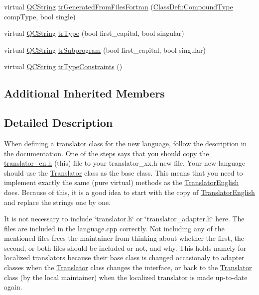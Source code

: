 \begin{DoxyCompactItemize}
\item 
virtual \mbox{\hyperlink{class_q_c_string}{Q\+C\+String}} \mbox{\hyperlink{class_translator_vietnamese_a6d35ff7785c1a994ab25f81bc09ba5fe}{tr\+Generated\+From\+Files\+Fortran}} (\mbox{\hyperlink{class_class_def_ae70cf86d35fe954a94c566fbcfc87939}{Class\+Def\+::\+Compound\+Type}} comp\+Type, bool single)
\item 
virtual \mbox{\hyperlink{class_q_c_string}{Q\+C\+String}} \mbox{\hyperlink{class_translator_vietnamese_a50c0eababc13e83e0ddf8caff673b40c}{tr\+Type}} (bool first\+\_\+capital, bool singular)
\item 
virtual \mbox{\hyperlink{class_q_c_string}{Q\+C\+String}} \mbox{\hyperlink{class_translator_vietnamese_a49e7db7f5dfd5402a3b89c78146df255}{tr\+Subprogram}} (bool first\+\_\+capital, bool singular)
\item 
virtual \mbox{\hyperlink{class_q_c_string}{Q\+C\+String}} \mbox{\hyperlink{class_translator_vietnamese_a666071701ac65aa7b81fabeedfbb1ea3}{tr\+Type\+Constraints}} ()
\end{DoxyCompactItemize}
\subsection*{Additional Inherited Members}


\subsection{Detailed Description}
When defining a translator class for the new language, follow the description in the documentation. One of the steps says that you should copy the \mbox{\hyperlink{translator__en_8h_source}{translator\+\_\+en.\+h}} (this) file to your translator\+\_\+xx.\+h new file. Your new language should use the \mbox{\hyperlink{class_translator}{Translator}} class as the base class. This means that you need to implement exactly the same (pure virtual) methods as the \mbox{\hyperlink{class_translator_english}{Translator\+English}} does. Because of this, it is a good idea to start with the copy of \mbox{\hyperlink{class_translator_english}{Translator\+English}} and replace the strings one by one.

It is not necessary to include \char`\"{}translator.\+h\char`\"{} or \char`\"{}translator\+\_\+adapter.\+h\char`\"{} here. The files are included in the language.\+cpp correctly. Not including any of the mentioned files frees the maintainer from thinking about whether the first, the second, or both files should be included or not, and why. This holds namely for localized translators because their base class is changed occasionaly to adapter classes when the \mbox{\hyperlink{class_translator}{Translator}} class changes the interface, or back to the \mbox{\hyperlink{class_translator}{Translator}} class (by the local maintainer) when the localized translator is made up-\/to-\/date again. 

